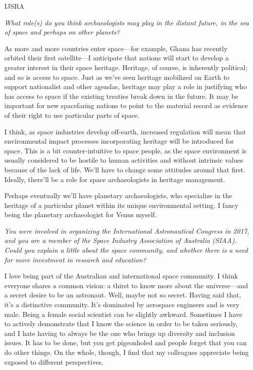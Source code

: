 \begin{labeling}{IJSRA}
	\item[IJSRA] \emph{What role(s) do you think archaeologists may play in the distant future, in the sea of space and perhaps on other planets?}

	\item[AG] As more and more countries enter space—for example, Ghana has recently orbited their first satellite—I anticipate that nations will start to develop a greater interest in their space heritage. Heritage, of course, is inherently political; and so is access to space. Just as we’ve seen heritage mobilized on Earth to support nationalist and other agendas, heritage may play a role in justifying who has access to space if the existing treaties break down in the future. It may be important for new spacefaring nations to point to the material record as evidence of their right to use particular parts of space.

	I think, as space industries develop off-earth, increased regulation will mean that environmental impact processes incorporating heritage will be introduced for space. This is a bit counter-intuitive to space people, as the space environment is usually considered to be hostile to human activities and without intrinsic values because of the lack of life. We’ll have to change some attitudes around that first. Ideally, there’ll be a role for space archaeologists in heritage management.

	Perhaps eventually we’ll have planetary archaeologists, who specialize in the heritage of a particular planet within its unique environmental setting. I fancy being the planetary archaeologist for Venus myself.

	\item[IJSRA] \emph{You were involved in organizing the International Astronautical Congress in 2017, and you are a member of the Space Industry Association of Australia (SIAA). Could you explain a little about the space community, and whether there is a need for more investment in research and education?}

	\item[AG] I love being part of the Australian and international space community. I think everyone shares a common vision: a thirst to know more about the universe—and a secret desire to be an astronaut. Well, maybe not so secret. Having said that, it’s a distinctive community. It’s dominated by aerospace engineers and is very male. Being a female social scientist can be slightly awkward. Sometimes I have to actively demonstrate that I know the science in order to be taken seriously, and I hate having to always be the one who brings up diversity and inclusion issues. It has to be done, but you get pigeonholed and people forget that you can do other things. On the whole, though, I find that my colleagues appreciate being exposed to different perspectives.


\end{labeling}
